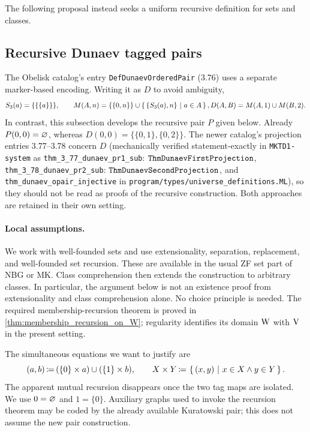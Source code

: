 The following proposal instead seeks a uniform recursive definition for sets and classes.

\subsection{Recursive Dunaev tagged pairs}
\label{sec:dunaev_tagged_ordered_pair}
\begin{remark}
The Obelisk catalog's entry \texttt{DefDunaevOrderedPair} (3.76) uses a
separate marker-based encoding. Writing it as $D$ to avoid ambiguity,
\[
S_3(a)=\{\{\{a\}\}\},\qquad M(A,n)=\{\{0,n\}\}\cup\left\{\,\{S_3(a),n\}\ \middle|\ a\in A\,\right\},
D(A,B)=M(A,1)\cup M(B,2).
\]
In contrast, this subsection develops the recursive pair $P$ given below.
Already $P(0,0)=\varnothing$, whereas
$D(0,0)=\{\{0,1\},\{0,2\}\}$. The newer catalog's projection entries
3.77--3.78 concern $D$ (mechanically verified statement-exactly in \texttt{MKTD1-system} as \texttt{thm\_3\_77\_dunaev\_pr1\_sub}: $\kernelstmt{ThmDunaevFirstProjection}$, \texttt{thm\_3\_78\_dunaev\_pr2\_sub}: $\kernelstmt{ThmDunaevSecondProjection}$, and \texttt{thm\_dunaev\_opair\_injective} in \texttt{program/types/universe\_definitions.ML}), so they should not be read as proofs of the
recursive construction. Both approaches are retained in their own setting.
\end{remark}

\paragraph{Local assumptions.}
We work with well-founded sets and use extensionality, separation,
replacement, and well-founded set recursion. These are available in the
usual ZF set part of NBG or MK. Class comprehension then extends the
construction to arbitrary classes. In particular, the argument below is not
an existence proof from extensionality and class comprehension alone.
No choice principle is needed.
The required membership-recursion theorem is proved in
\ref{thm:membership_recursion_on_W}; regularity identifies its domain
$\mathrm{W}$ with $\mathrm{V}$ in the present setting.

The simultaneous equations we want to justify are
\[
(a,b) \,{\coloneqq}\, (\{0\}\times a)\cup (\{1\}\times b),
\qquad
X\times Y \,{\coloneqq}\, \left\{\,(x,y)\ \middle|\ x\in X \land y\in Y\,\right\}.
\]
The apparent mutual recursion disappears once the two tag maps are isolated.
We use $0=\varnothing$ and $1=\{0\}$. Auxiliary graphs used to invoke the
recursion theorem may be coded by the already available Kuratowski pair;
this does not assume the new pair construction.

